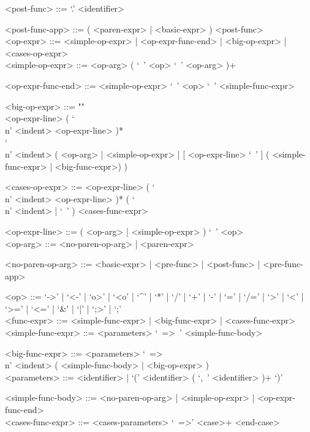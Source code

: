 \documentclass{article}
\begin{document}
\begin{grammar}
<post-func> ::= `.' <identifier>

<post-func-app> ::= ( <paren-expr> | <basic-expr> ) <post-func> \\

<op-expr> ::=
<simple-op-expr> | <op-expr-func-end> | <big-op-expr> | <cases-op-expr>
\\

<simple-op-expr> ::=  <op-arg> ( `\ ' <op>  `\ ' <op-arg> )+

<op-expr-func-end> ::= <simple-op-expr> `\ '  <op> `\ ' <simple-func-expr>

<big-op-expr> ::= ""\\
<op-expr-line> ( `\\n' <indent> <op-expr-line> )* \\
`\\n' <indent>
( <op-arg> | <simple-op-expr> |
  [ <op-expr-line> `\ ' ] ( <simple-func-expr> | <big-func-expr>)
)

<cases-op-expr> ::=
<op-expr-line> ( `\\n' <indent> <op-expr-line> )*
( `\\n' <indent> | `\ ' ) <cases-func-expr> 

<op-expr-line> ::= ( <op-arg> | <simple-op-expr> ) `\ ' <op> 
\\

<op-arg> ::= <no-paren-op-arg> | <paren-expr>

<no-paren-op-arg> ::= <basic-expr> | <pre-func> | <post-func> | <pre-func-app>

<op> ::= 
`->' | `<-' | `o>' | `<o' | `^' | `*' | `/' | `+' | `-' |
`=' | `/=' | `>' | `<' | `>=' | `<=' | `\&' | `|' | `;>' | `;'\\

<func-expr> ::= <simple-func-expr> | <big-func-expr> | <cases-func-expr> \\

<simple-func-expr> ::= <parameters> `\ =>\ ' <simple-func-body>

<big-func-expr> ::=
<parameters> `\ =>\\n' <indent> ( <simple-func-body> | <big-op-expr> )
\\

<parameters> ::= <identifier> | `(' <identifier> ( `,\ ' <identifier> )+ `)'

<simple-func-body> ::= <no-paren-op-arg> | <simple-op-expr> | <op-expr-func-end> \\

<cases-func-expr> ::= <cases-parameters> `\ =>' <case>+ <end-case> 


\end{grammar}
\end{document}
